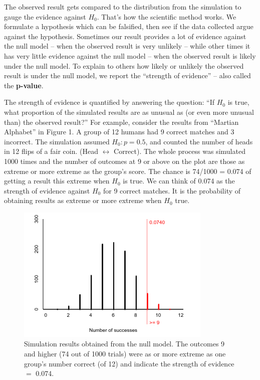       The observed result gets compared to the distribution from the
      simulation to gauge the evidence against $H_0$.  That's
      how the scientific method works.  We formulate a hypothesis
      which can be falsified, then see if the data collected argue
      against the hypothesis. Sometimes our result provides a lot of
      evidence against the null model  -- when the observed result is very
      unlikely -- while other times it has very little evidence against
      the null model -- when the observed result is likely under the null
      model. To explain to others  how likely or unlikely the
      observed result is under the null model, we  report the
      ``strength of evidence'' -- also called the {\bf p-value}. 

      The strength of evidence is quantified by answering the
      question: ``If $H_0$ is true, what proportion of the simulated
      results are as unusual as (or even more unusual than) the
      observed result?'' 
      For example, consider the results from ``Martian Alphabet''  in
      Figure 1. A group of 12 humans had 9 correct matches and 3
      incorrect. The simulation assumed $H_0: p = 0.5$, and counted
      the number of heads in 12 flips of a fair coin. (Head
      $\leftrightarrow$ Correct). 
      The whole process was simulated 1000 times and the number of
      outcomes at 9 or above on the plot are those as extreme or more
      extreme as the group's score. The chance is 74/1000 =
      0.074 of getting a result this extreme when $H_0$ is
      true.  We can think of 0.074 as the strength of evidence against
      $H_0$  for 9 correct matches. It is
      the probability of obtaining results as extreme or more extreme
      when $H_0$ true.
 \begin{figure}[h]
   \centering
  \includegraphics[width=.5\linewidth]{../plots/StrOfEvidence-12Guesses.png}

   \caption{ Simulation results obtained from the null model. The
      outcomes 9 and higher (74 out of 1000 trials) were as or more extreme
      as one group's number correct (of 12) and indicate the strength of
      evidence $=$ 0.074. }
   \label{fig:SOE-12}
 \end{figure}
\begin{students}
    \newpage
\end{students}

